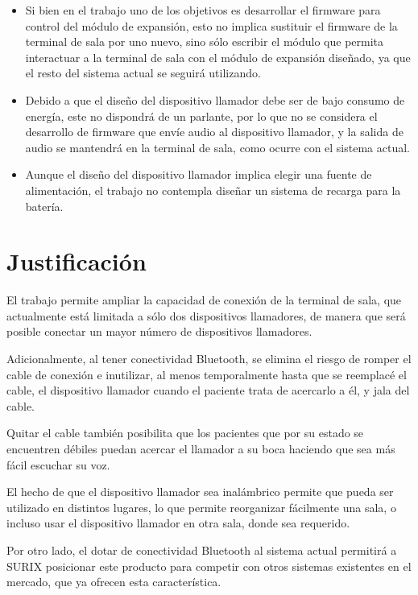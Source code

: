 \begin{itemize}
\item Si bien en el trabajo uno de los objetivos es desarrollar el firmware para control del módulo de expansión, esto no implica sustituir el firmware de la terminal de sala por uno nuevo, sino sólo escribir el módulo que permita interactuar a la terminal de sala con el módulo de expansión diseñado, ya que el resto del sistema actual se seguirá utilizando.	

\item Debido a que el diseño del dispositivo llamador debe ser de bajo consumo de energía, este no dispondrá de un parlante, por lo que no se considera el desarrollo de firmware que envíe audio al dispositivo llamador, y la salida de audio se mantendrá en la terminal de sala, como ocurre con el sistema actual.

\item Aunque el diseño del dispositivo llamador implica elegir una fuente de alimentación, el trabajo no contempla diseñar un sistema de recarga para la batería.

\end{itemize}


\section{Justificación}

El trabajo permite ampliar la capacidad de conexión de la terminal de sala, que actualmente está limitada a sólo dos dispositivos llamadores, de manera que será posible conectar un mayor número de dispositivos llamadores.

Adicionalmente, al tener conectividad Bluetooth, se elimina el riesgo de romper el cable de conexión e inutilizar, al menos temporalmente hasta que se reemplacé el cable, el dispositivo llamador cuando el paciente trata de acercarlo a él, y jala del cable.

Quitar el cable también posibilita que los pacientes que por su estado se encuentren débiles puedan acercar el llamador a su boca haciendo que sea más fácil escuchar su voz.

El hecho de que el dispositivo llamador sea inalámbrico permite que pueda ser utilizado en distintos lugares, lo que permite reorganizar fácilmente una sala, o incluso usar el dispositivo llamador en otra sala, donde sea requerido.

Por otro lado, el dotar de conectividad Bluetooth al sistema actual permitirá a SURIX posicionar este producto para competir con otros sistemas existentes en el mercado, que ya ofrecen esta característica.
